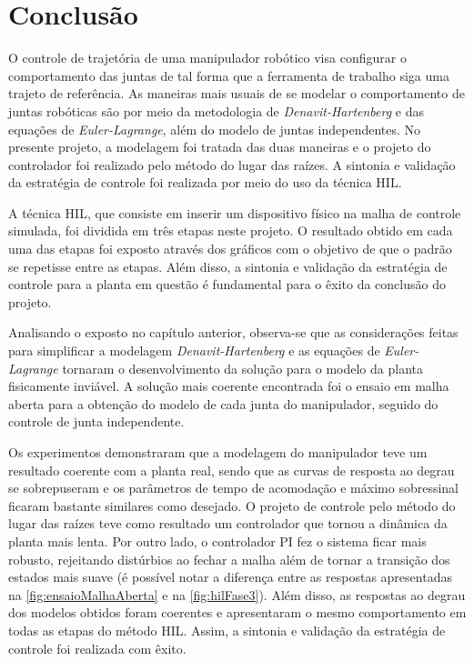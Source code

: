 \chapter{Conclusão}

O controle de trajetória de uma manipulador robótico visa configurar o comportamento das juntas de tal 
forma que a ferramenta de trabalho siga uma trajeto de referência.
As maneiras mais usuais de se modelar o comportamento de juntas robóticas são por meio da metodologia de
\textit{Denavit-Hartenberg} e das equações de \textit{Euler-Lagrange}, além do modelo de juntas independentes.
No presente projeto, a modelagem foi tratada das duas maneiras
e o projeto do controlador foi realizado pelo método do lugar das raízes. A sintonia e validação da estratégia de controle
foi realizada por meio do uso da técnica HIL.

A técnica HIL, que consiste em inserir um dispositivo físico na malha de controle simulada, foi dividida
em três etapas neste projeto. O resultado obtido em cada uma das etapas foi exposto através
dos gráficos com o objetivo de que o padrão se repetisse entre as etapas. Além disso, a sintonia
e validação da estratégia de controle para a planta em questão é fundamental para o êxito da 
conclusão do projeto.

Analisando o exposto no capítulo anterior, observa-se que as considerações feitas para simplificar
a modelagem \textit{Denavit-Hartenberg} e as equações de \textit{Euler-Lagrange} tornaram o desenvolvimento
da solução para o modelo da planta fisicamente inviável. A solução mais coerente encontrada foi o ensaio 
em malha aberta para a obtenção do modelo de cada junta do manipulador, seguido do controle de junta independente.

Os experimentos demonstraram que a modelagem do manipulador teve um resultado coerente com a planta real, sendo que as curvas
de resposta ao degrau se sobrepuseram e os parâmetros de tempo de acomodação e máximo sobressinal ficaram bastante similares como desejado. 
O projeto de controle pelo método do lugar das raízes teve como resultado um controlador que tornou a dinâmica da 
planta mais lenta. Por outro lado, o controlador PI fez o sistema ficar mais robusto, rejeitando distúrbios ao fechar
a malha além de tornar a transição dos estados mais suave (é possível notar a diferença entre as respostas apresentadas na 
\autoref{fig:ensaioMalhaAberta} e na \autoref{fig:hilFase3}). Além disso, as respostas ao degrau dos modelos obtidos
foram coerentes e apresentaram o mesmo comportamento em todas as etapas do método HIL. Assim, a sintonia e
validação da estratégia de controle foi realizada com êxito.


